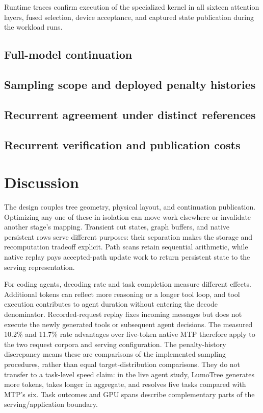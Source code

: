 \documentclass[conference]{IEEEtran}
\newcommand{\sys}{LumoTree}
\begin{document}
Runtime traces confirm execution of the specialized kernel in all sixteen attention layers, fused selection, device acceptance, and captured state publication during the workload runs.

\subsection{Full-model continuation}
\label{sec:fullmodel-validation}


\subsection{Sampling scope and deployed penalty histories}
\label{sec:sampling-validation}


\subsection{Recurrent agreement under distinct references}
\label{sec:m1-qualification}


\subsection{Recurrent verification and publication costs}
\label{sec:mechanism-costs}


\section{Discussion}
\label{sec:discussion}
The design couples tree geometry, physical layout, and continuation publication. Optimizing any one of these in isolation can move work elsewhere or invalidate another stage's mapping. Transient cut states, graph buffers, and native persistent rows serve different purposes: their separation makes the storage and recomputation tradeoff explicit. Path scans retain sequential arithmetic, while native replay pays accepted-path update work to return persistent state to the serving representation.

For coding agents, decoding rate and task completion measure different effects. Additional tokens can reflect more reasoning or a longer tool loop, and tool execution contributes to agent duration without entering the decode denominator. Recorded-request replay fixes incoming messages but does not execute the newly generated tools or subsequent agent decisions. The measured 10.2\% and 11.7\% rate advantages over five-token native MTP therefore apply to the two request corpora and serving configuration. The penalty-history discrepancy means these are comparisons of the implemented sampling procedures, rather than equal target-distribution comparisons. They do not transfer to a task-level speed claim: in the live agent study, \sys{} generates more tokens, takes longer in aggregate, and resolves five tasks compared with MTP's six. Task outcomes and GPU spans describe complementary parts of the serving/application boundary.
\end{document}
